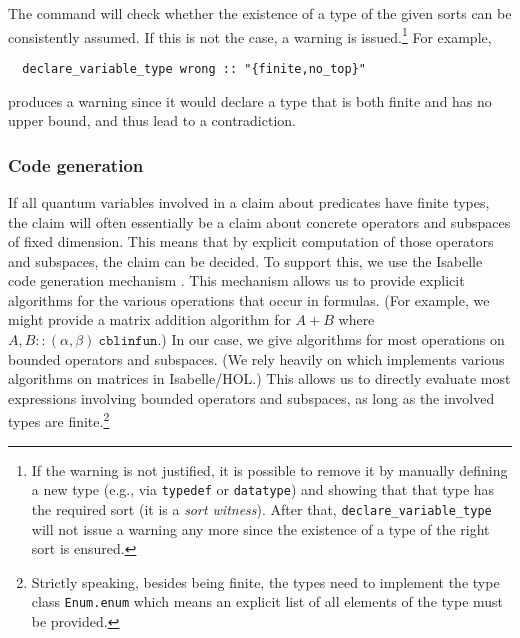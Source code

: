 \documentclass{article}
\begin{document}
The command will check whether the existence of a type of the given
sorts can be consistently assumed.  If this is not the case, a warning
is issued.\footnote{If the warning is not justified, it is possible to
  remove it by manually defining a new type (e.g., via
  \texttt{typedef} or \texttt{datatype}) and showing that that type
  has the required sort (it is a \emph{sort witness}). After that,
  \texttt{declare\_variable\_type} will not issue a warning any more
  since the existence of a type of the right sort is ensured.}  For
example,
\begin{lstlisting}
  declare_variable_type wrong :: "{finite,no_top}"
\end{lstlisting}
produces a warning since it would declare a type that is both finite
and has no upper bound, and thus lead to a contradiction.



\subsubsection{Code generation}
If all quantum variables involved in a
claim about predicates have finite types, the claim will often
essentially be a claim about concrete operators and subspaces of fixed
dimension. This means that by explicit computation of those operators and
subspaces, the claim can be decided. To support this, we use the
Isabelle code generation mechanism 
\cite{isabelle-codegen}. This mechanism allows us to provide explicit
algorithms for the various operations that occur in formulas. (For
example, we might provide a matrix addition algorithm for $A+B$
where $A,B::(\alpha,\beta)\ \mathtt{cblinfun}$.)
In our case, we give algorithms for most operations on bounded
operators and subspaces. (We rely heavily on \cite{Jordan_Normal_Form-AFP} which
implements various algorithms on matrices in Isabelle/HOL.) This
allows us to directly evaluate most expressions involving bounded
operators and subspaces, as long as the involved types are
finite.\footnote{Strictly speaking, besides being finite, the types need to implement the
  type class \texttt{Enum.enum} which means an explicit list of all
  elements of the type must be provided.}
\end{document}
